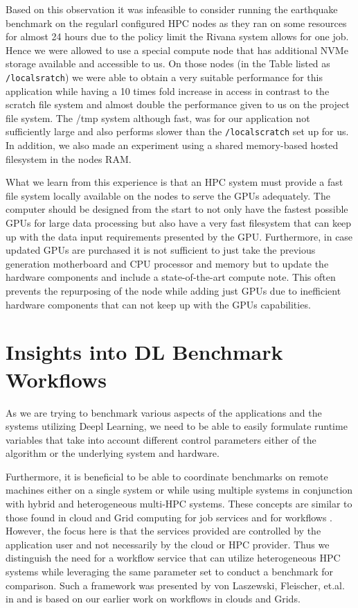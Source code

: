 \documentclass[utf8]{FrontiersinVancouver} %
\begin{document}
{  Based on this observation it was infeasible to consider running the
  earthquake benchmark on the regularl configured HPC nodes as they
  ran on some resources for almost 24 hours due to the policy limit
  the Rivana system allows for one job. Hence we were allowed to use a
  special compute node that has additional NVMe storage available and
  accessible to us. On those nodes (in the Table listed as
  \verb|/localsratch|) we were able to obtain a very suitable
  performance for this application while having a 10 times fold
  increase in access in contrast to the scratch file system and almost
  double the performance given to us on the project file system. The
  /tmp system although fast, was for our application not sufficiently
  large and also performs slower than the \verb|/localscratch| set up
  for us. In addition, we also made an experiment using a shared
  memory-based hosted filesystem in the nodes RAM.

  What we learn from this experience is that an HPC system must
  provide a fast file system locally available on the nodes to serve
  the GPUs adequately. The computer should be designed from the start
  to not only have the fastest possible GPUs for large data processing
  but also have a very fast filesystem that can keep up with the data
  input requirements presented by the GPU. Furthermore, in case
  updated GPUs are purchased it is not sufficient to just take the
  previous generation motherboard and CPU processor and memory but to
  update the hardware components and include a state-of-the-art
  compute note. This often prevents the repurposing of the node while
  adding just GPUs due to inefficient hardware components that can not
  keep up with the GPUs capabilities.

  


\section{Insights into DL Benchmark Workflows}
\label{sec:workflow-main}

As we are trying to benchmark various aspects of the applications and
the systems utilizing Deepl Learning, we need to be able to easily
formulate runtime variables that take into account different control
parameters either of the algorithm or the underlying system and
hardware.

Furthermore, it is beneficial to be able to coordinate benchmarks on
remote machines either on a single system or while using multiple
systems in conjunction with hybrid and heterogeneous multi-HPC
systems. These concepts are similar to those found in cloud and Grid
computing for job services \citep{las-infogram} and for workflows
\citep{las-workflow,las07-workflow}. However, the focus here is that
the services provided are controlled by the application user and not
necessarily by the cloud or HPC provider. Thus we distinguish the need
for a workflow service that can utilize heterogeneous HPC systems
while leveraging the same parameter set to conduct a benchmark for
comparison. Such a framework was presented by von Laszewski, Fleischer,
et.al. in \citep{las-22-arxiv-workflow-cc} and is based on our earlier
work on workflows in clouds and Grids.

}
\end{document}
